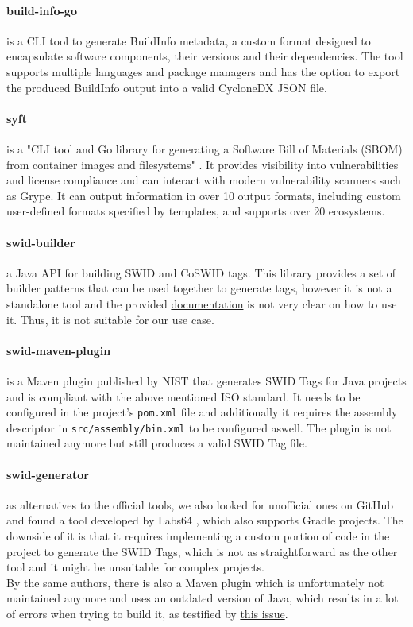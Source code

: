 \paragraph{build-info-go} is a CLI tool to generate BuildInfo metadata, a custom format designed to encapsulate software components, their versions and their dependencies. The tool supports multiple languages and package managers and has the option to export the produced BuildInfo output into a valid CycloneDX JSON file.

\paragraph{syft} is a "CLI tool and Go library for generating a Software Bill of Materials (SBOM) from container images and filesystems" \cite{repository:cyclonedx:syft}. It provides visibility into vulnerabilities and license compliance and can interact with modern vulnerability scanners such as Grype. It can output information in over 10 output formats, including custom user-defined formats specified by templates, and supports over 20 ecosystems.

\paragraph{swid-builder} a Java API for building SWID and CoSWID tags. This library provides a set of builder patterns that can be used together to generate tags, however it is not a standalone tool and the provided \href{https://pages.nist.gov/swid-tools/swid-builder/apidocs/index.html}{documentation} is not very clear on how to use it. Thus, it is not suitable for our use case.

\paragraph{swid-maven-plugin} is a Maven plugin published by NIST \cite{repository:swid-maven-plugin} that generates SWID Tags for Java projects and is compliant with the above mentioned ISO standard. It needs to be configured in the project's \verb|pom.xml| file and additionally it requires the assembly descriptor in \verb|src/assembly/bin.xml| to be configured aswell. The plugin is not maintained anymore but still produces a valid SWID Tag file.

\paragraph{swid-generator} as alternatives to the official tools, we also looked for unofficial ones on GitHub and found a tool developed by Labs64 \cite{repo:swid-generator}, which also supports Gradle projects. The downside of it is that it requires implementing a custom portion of code in the project to generate the SWID Tags, which is not as straightforward as the other tool and it might be unsuitable for complex projects. 
\\ By the same authors, there is also a Maven plugin which is unfortunately not maintained anymore and uses an outdated version of Java, which results in a lot of errors when trying to build it, as testified by \href{https://github.com/Labs64/swid-maven-plugin/issues/5}{this issue}.


